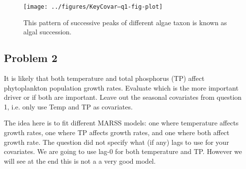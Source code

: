 \begin{figure}[htp]
\begin{center}
\texttt{[image: ../figures/KeyCovar--q1-fig-plot]}
\end{center}
\caption{This pattern of successive peaks of different algae taxon is known as algal succession.}
\end{figure}

\clearpage

\subsection*{Problem 2}
It is likely that both temperature and total phosphorus (TP) affect phytoplankton population growth rates. Evaluate which is the more important driver or if both are important. Leave out the seasonal covariates from question 1, i.e. only use Temp and TP as covariates.

\bigskip
The idea here is to fit different MARSS models: one where temperature affects growth rates, one where TP affects growth rates, and one where both affect growth rate.  The question did not specify what (if any) lags to use for your covariates.  We are going to use lag-0 for both temperature and TP.  However we will see at the end this is not a a very good model.  

